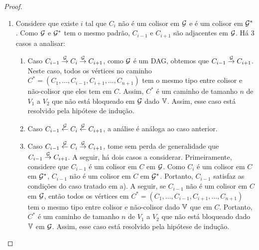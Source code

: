 \begin{proof}
\begin{enumerate}[label=\alph*)]
  \item Considere que existe $i$ tal que
  $C_i$ não é um colisor em ${\mathcal G}$ e
  é um colisor em ${\mathcal G}^*$.
  Como ${\mathcal G}$ e ${\mathcal G}^*$ tem o mesmo padrão,
  $C_{i-1}$ e $C_{i+1}$ são adjacentes em ${\mathcal G}$.
  Há 3 casos a analisar:
  \begin{enumerate}[label=\Roman*)]
   \item Caso $C_{i-1} \stackrel{{\mathcal G}}{\rightarrow} C_i \stackrel{{\mathcal G}}{\rightarrow} C_{i+1}$,
   como ${\mathcal G}$ é um DAG, obtemos que 
   $C_{i-1} \stackrel{{\mathcal G}}{\rightarrow} C_{i+1}$.
   Neste caso, todos os vértices no caminho 
   $C^* = (C_1,\ldots,C_{i-1},C_{i+1},\ldots,C_{n+1})$ tem
   o mesmo tipo entre colisor e não-colisor que eles tem em $C$.
   Assim, $C^*$ é um caminho de tamanho $n$ de $V_1$ a $V_2$ que
   não está bloqueado em ${\mathcal G}$ dado ${\mathbb V}$.
   Assim, esse caso está resolvido pela hipótese de indução.
   
   \item Caso $C_{i-1} \stackrel{{\mathcal G}}{\leftarrow} C_i \stackrel{{\mathcal G}}{\leftarrow} C_{i+1}$,
   a análise é análoga ao caso anterior.
   
   \item Caso $C_{i-1} \stackrel{{\mathcal G}}{\leftarrow} C_i \stackrel{{\mathcal G}}{\rightarrow} C_{i+1}$,
   tome sem perda de generalidade que
   $C_{i-1} \stackrel{{\mathcal G}}{\rightarrow} C_{i+1}$.
   A seguir, há dois casos a considerar. 
   Primeiramente, considere que $C_{i-1}$ é um colisor em $C$ em ${\mathcal G}$.
   Como $C_i$ é um colisor em $C$ em ${\mathcal G}^*$, 
   $C_{i-1}$ não é um colisor em $C$ em ${\mathcal G}^*$.
   Portanto, $C_{i-1}$ satisfaz as condições do caso tratado em a).
   A seguir, se $C_{i-1}$ não é um colisor em $C$ em ${\mathcal G}$, então
   todos os vértices em 
   $C^* = (C_1, \ldots, C_{i-1}, C_{i+1},\ldots,C_{n+1})$ tem
   o mesmo tipo entre colisor e não-colisor dado ${\mathbb V}$ que em $C$.
   Portanto, $C^*$ é um caminho de tamanho $n$ de
   $V_1$ a $V_2$ que não está bloqueado dado ${\mathbb V}$ em ${\mathcal G}$.
   Assim, esse caso está resolvido pela hipótese de indução.
  \end{enumerate}
  

\end{enumerate}
\end{proof}
